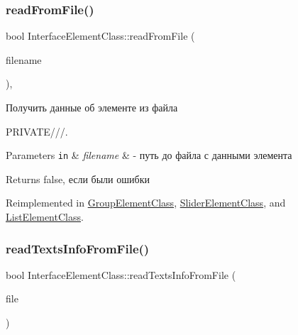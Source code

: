 \subsubsection{\texorpdfstring{read\+From\+File()}{readFromFile()}}
{\footnotesize\ttfamily bool Interface\+Element\+Class\+::read\+From\+File (\begin{DoxyParamCaption}\item[{\hyperlink{class_path_class}{Path\+Class} $\ast$}]{filename }\end{DoxyParamCaption})\hspace{0.3cm}{\ttfamily [protected]}, {\ttfamily [virtual]}}



Получить данные об элементе из файла 

P\+R\+I\+V\+A\+T\+E///.


\begin{DoxyParams}[1]{Parameters}
\mbox{\tt in}  & {\em filename} & -\/ путь до файла с данными элемента \\
\hline
\end{DoxyParams}
\begin{DoxyReturn}{Returns}
false, если были ошибки 
\end{DoxyReturn}


Reimplemented in \hyperlink{class_group_element_class_aaf510a287861dc4096cbe14f0551c8f5}{Group\+Element\+Class}, \hyperlink{class_slider_element_class_a68082cc20a1c0940aa5057e5ece89a60}{Slider\+Element\+Class}, and \hyperlink{class_list_element_class_a92e91862b4f1a5280d9465f90a7eefb5}{List\+Element\+Class}.

\mbox{\label{class_interface_element_class_afc8ee340b6aa0b99e3280b424aa5c519}} 
\subsubsection{\texorpdfstring{read\+Texts\+Info\+From\+File()}{readTextsInfoFromFile()}}
{\footnotesize\ttfamily bool Interface\+Element\+Class\+::read\+Texts\+Info\+From\+File (\begin{DoxyParamCaption}\item[{std\+::ifstream $\ast$}]{file }\end{DoxyParamCaption})\hspace{0.3cm}{\ttfamily [protected]}}



